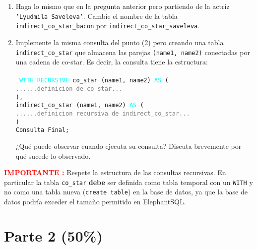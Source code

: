 \documentclass[11pt,a4paper]{article}
\begin{document}
\begin{enumerate}
\item Haga lo mismo que en la pregunta anterior pero partiendo de la actriz {\tt 'Lyudmila Saveleva'}. Cambie el nombre de la tabla 
{\tt indirect\_co\_star\_bacon} por {\tt indirect\_co\_star\_saveleva}. 

\item Implemente la misma consulta del punto (2) pero creando una tabla {\tt indirect\_co\_star} que almacena las parejas {\tt (name1, name2)} conectadas por una cadena de co-star. Es decir, la consulta tiene la estructura:\\\\
{\tt
\textcolor{cyan}{WITH RECURSIVE} co\_star (name1, name2) \textcolor{cyan}{AS} (\\
\textcolor{gray}{......definicion de co\_star...}\\
), \\
indirect\_co\_star (name1, name2) \textcolor{cyan}{AS} (\\
\textcolor{gray}{......definicion recursiva de indirect\_co\_star...}\\
) \\
Consulta Final;\\
}

¿Qué puede observar cuando ejecuta su consulta? Discuta brevemente por qué sucede lo observado. 
\end{enumerate}

\noindent
\textcolor{red}{{\bf IMPORTANTE :}} Respete la estructura de las consultas recursivas. En particular la tabla {\tt co\_star} {\bf debe} ser definida como tabla temporal con un {\tt WITH} y no como una tabla nueva ({\tt create table}) en la base de datos, ya que la base de datos podría exceder el tamaño permitido en ElephantSQL. 

\section*{Parte 2 (50\%)} 
\end{document}
